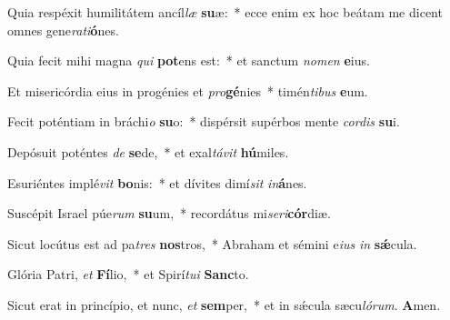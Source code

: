 \item Quia respéxit humilitátem ancíl\textit{læ} \textbf{su}æ:~* ecce enim ex hoc beátam me dicent omnes gene\textit{rati}\textbf{ó}nes.

\item Quia fecit mihi magna \textit{qui} \textbf{pot}ens est:~* et sanctum \textit{nomen} \textbf{e}ius.

\item Et misericórdia eius in progénies et \textit{pro}\textbf{gé}nies~* timén\textit{tibus} \textbf{e}um.

\item Fecit poténtiam in bráchi\textit{o} \textbf{su}o:~* dispérsit supérbos mente \textit{cordis} \textbf{su}i.

\item Depósuit poténtes \textit{de} \textbf{se}de,~* et exal\textit{távit} \textbf{hú}miles.

\item Esuriéntes implé\textit{vit} \textbf{bo}nis:~* et dívites dimí\textit{sit} \textit{in}\textbf{á}nes.

\item Suscépit Israel púe\textit{rum} \textbf{su}um,~* recordátus mi\textit{seri}\textbf{cór}diæ.

\item Sicut locútus est ad pa\textit{tres} \textbf{nos}tros,~* Abraham et sémini e\textit{ius} \textit{in} \textbf{sǽ}cula.

\item Glória Patri, \textit{et} \textbf{Fí}lio,~* et Spirí\textit{tui} \textbf{Sanc}to.

\item Sicut erat in princípio, et nunc, \textit{et} \textbf{sem}per,~* et in sǽcula sæcu\textit{lórum}. \textbf{A}men.